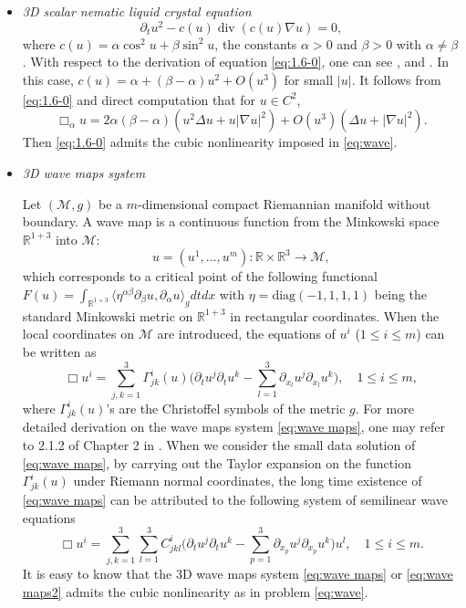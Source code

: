 \documentclass[11pt,twoside]{article}
\DeclareMathOperator{\Div}{div}
\theoremstyle{plain}
\theoremstyle{definition}
\numberwithin{equation}{section}
\begin{document}
\begin{itemize}
\item \textit{3D scalar nematic liquid crystal equation}
\begin{equation}\label{eq:1.6-0}
\partial_tu^2-c(u)\Div(c(u)\nabla u)=0,
\end{equation}
where $c(u)=\alpha \cos^2u+\beta \sin^2 u$, the constants $\alpha>0$ and $\beta>0$ with $\alpha \neq \beta$.
With respect to the derivation of equation \eqref{eq:1.6-0}, one can see \cite{Crit-1}, \cite{Crit-2} and \cite{Crit-3}.
In this case, $c(u)=\alpha+(\beta-\alpha)u^2+O(u^3)$ for small $|u|$. It follows from \eqref{eq:1.6-0} and direct computation that
for $u\in C^2$,
\begin{equation*}
	\Box_\alpha u = 2\alpha(\beta-\alpha)(u^2\Delta u+ u|\nabla u|^2)+O(u^3)(\Delta u +|\nabla u|^2).
\end{equation*}
Then \eqref{eq:1.6-0} admits the cubic nonlinearity
imposed in \eqref{eq:wave}.


	\item \textit{3D wave maps system}

	Let $(\mathcal{M},g)$ be a $m$-dimensional compact Riemannian manifold without boundary. A wave map is a continuous
function from the Minkowski space $\mathbb{R}^{1+3}$ into $\mathcal{M}$:
	$$
	u=(u^1, ..., u^m) : \mathbb{R} \times \mathbb{R}^3 \longrightarrow \mathcal{M},
	$$
	which corresponds to a critical point of the following functional
	$F(u) = \int_{\mathbb{R}^{1+3}} \langle \eta^{\alpha\beta} \partial_\beta u, \partial_\alpha u \rangle_g dt dx$
	with $\eta=\mathrm{diag}(-1,1,1,1)$ being the standard Minkowski metric on $\mathbb{R}^{1+3}$ in rectangular coordinates. When the local coordinates on $\mathcal{M}$ are introduced, the equations of $u^i$ ($1\leq i\leq m$) can be written as
\begin{equation}\label{eq:wave maps}
\Box u^i
=\sum_{j,k=1}^3\Gamma_{jk}^i(u)\big(\partial_t u^j\partial_t u^k-\sum_{l=1}^3\partial_{x_l}u^j\partial_{x_l}u^k\big), \quad 1\leq i\leq m,
\end{equation}
where $\Gamma_{jk}^i(u)$'s are the Christoffel symbols of the metric $g$. For more detailed derivation on the wave maps system \eqref{eq:wave maps}, one may refer to 2.1.2 of Chapter 2 in \cite{Shatah}. When we consider the small data solution of \eqref{eq:wave maps}, by carrying out the Taylor expansion on the function $\Gamma_{jk}^i(u)$ under Riemann normal coordinates, the long time existence of \eqref{eq:wave maps} can be attributed to the following system of semilinear wave equations
\begin{equation}\label{eq:wave maps2}
\Box u^i = \sum_{j,k=1}^3 \sum_{l=1}^3 C_{jkl}^i \big(\partial_t u^j \partial_t u^k - \sum_{p=1}^3 \partial_{x_p} u^j \partial_{x_p} u^k \big)u^l, \quad 1 \leq i \leq m.
\end{equation}
It is easy to know that the 3D wave maps system \eqref{eq:wave maps} or \eqref{eq:wave maps2}
admits the cubic nonlinearity as in problem \eqref{eq:wave}.
\end{itemize}
\end{document}
